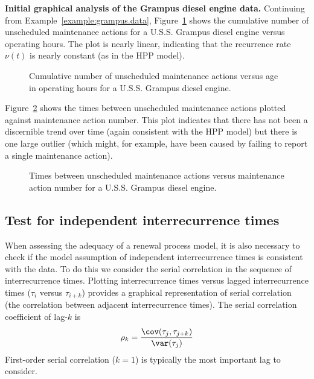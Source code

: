 \begin{example}{\bf Initial graphical analysis of the Grampus
diesel engine data.}
\label{example:grampus.initial.plots}
Continuing from Example~\ref{example:grampus.data},
Figure~\ref{figure:grampus.mcf.plot.ps} shows the cumulative number
of unscheduled maintenance actions for a U.S.S. Grampus diesel
engine versus operating hours. The plot is nearly linear, indicating
that the recurrence rate $\nu(t)$ is nearly constant (as in the HPP
model).
\begin{figure}
\caption{Cumulative number of unscheduled maintenance actions versus age 
in operating hours for a U.S.S. Grampus diesel engine.}
\label{figure:grampus.mcf.plot.ps}
\end{figure}
Figure~\ref{figure:grampus.repair.tsplot.ps} shows the times between
unscheduled maintenance actions plotted against maintenance action
number.  This plot indicates that there has not been a
discernible trend over time
(again consistent with the HPP model) but there is one large outlier
(which might, for example,
have been caused by failing to report a single
maintenance action).
\begin{figure}
\caption{Times between unscheduled maintenance actions versus maintenance 
action number for a U.S.S. Grampus diesel engine.}
\label{figure:grampus.repair.tsplot.ps}
\end{figure}
\end{example}

\subsection{Test for independent interrecurrence times}
When assessing the adequacy of a renewal process model, it is also
necessary to check if the model assumption of independent
interrecurrence times is consistent with the data. To do this we
consider the serial correlation in the sequence of interrecurrence
times. Plotting interrecurrence times versus lagged
interrecurrence times ($\tau_{i}$ versus $\tau_{i+k}$) provides a
graphical representation of serial correlation (the correlation
between adjacent interrecurrence times). The serial correlation
coefficient of lag-$k$ is
\begin{displaymath}
\rho_{k}=
\frac{\cov(\tau_{j},\tau_{j+k})}{
\var(\tau_{j})}
\end{displaymath}
First-order serial correlation ($k=1$) is typically the most important
lag to consider.

